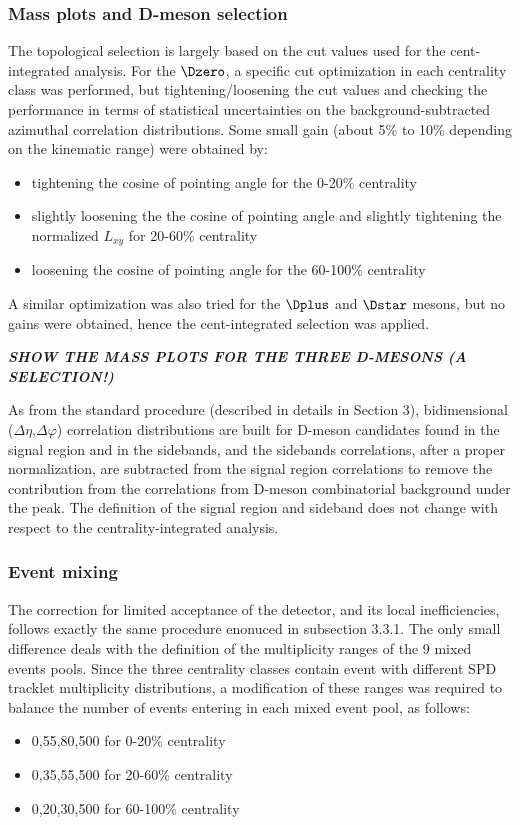 \subsubsection{Mass plots and D-meson selection}
The topological selection is largely based on the cut values used for the cent-integrated analysis.
For the $\Dzero$, a specific cut optimization in each centrality class was performed, but tightening/loosening the cut values and checking the performance in terms of statistical uncertainties on the background-subtracted azimuthal correlation distributions.
Some small gain (about 5\% to 10\% depending on the kinematic range) were obtained by:
\begin{itemize}
  \item tightening the cosine of pointing angle for the 0-20\% centrality
  \item slightly loosening the the cosine of pointing angle and slightly tightening the normalized $L_{xy}$  for 20-60\% centrality
  \item loosening the cosine of pointing angle for the 60-100\% centrality
\end{itemize}
A similar optimization was also tried for the $\Dplus$ and $\Dstar$ mesons, but no gains were obtained, hence the cent-integrated selection was applied.

\textit{\textbf{SHOW THE MASS PLOTS FOR THE THREE D-MESONS (A SELECTION!)}}

As from the standard procedure (described in details in Section 3), bidimensional ($\Delta\eta$,$\Delta\varphi$) correlation distributions are built for D-meson candidates found in the signal region and in the sidebands, and the sidebands correlations, after a proper normalization, are subtracted from the signal region correlations to remove the contribution from the correlations from D-meson combinatorial background under the peak. The definition of the signal region and sideband does not change with respect to the centrality-integrated analysis.

\subsubsection{Event mixing}
The correction for limited acceptance of the detector, and its local inefficiencies, follows exactly the same procedure enonuced in subsection 3.3.1.
The only small difference deals with the definition of the multiplicity ranges of the 9 mixed events pools. Since the three centrality classes contain event with different SPD tracklet multiplicity distributions, a modification of these ranges was required to balance the number of events entering in each mixed event pool, as follows:
\begin{itemize}
  \item {0,55,80,500} for 0-20\% centrality
  \item {0,35,55,500} for 20-60\% centrality
  \item {0,20,30,500} for 60-100\% centrality
\end{itemize}

